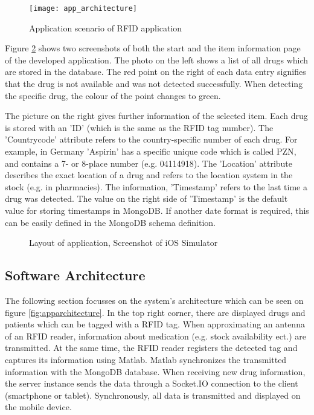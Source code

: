 \begin{figure}
\centering
\texttt{[image: app\_architecture]} 
\caption{\label{fig:appfunctionality}Application scenario of RFID application} 
\end{figure}

Figure \ref{fig:app_screenshot} shows two screenshots of both the start and the item information page of the developed application. The photo on the left shows a list of all drugs which are stored in the database. The red point on the right of each data entry signifies that the drug is not available and was not detected successfully. When detecting the specific drug, the colour of the point changes to green.

The picture on the right gives further information of the selected item. Each drug is stored with an 'ID' (which is the same as the RFID tag number). The 'Countrycode' attribute refers to the country-specific number of each drug. For example, in Germany 'Aspirin' has a specific unique code which is called \ac{PZN}, and contains a 7- or 8-place number (e.g. 04114918). The 'Location' attribute describes the exact location of a drug and refers to the location system in the stock (e.g. in pharmacies). The information, 'Timestamp' refers to the last time a drug was detected. The value on the right side of 'Timestamp' is the default value for storing timestamps in MongoDB. If another date format is required, this can be easily defined in the MongoDB schema definition.

\begin{figure}
\centering
{}
\caption{\label{fig:app_screenshot}Layout of application, Screenshot of iOS Simulator}
\end{figure}

\subsection{Software Architecture} \label{section_architecture}

The following section focusses on the system's architecture which can be seen on figure \ref{fig:apparchitecture}. In the top right corner, there are displayed drugs and patients which can be tagged with a RFID tag. When approximating an antenna of an RFID reader, information about medication (e.g. stock availability ect.) are transmitted. At the same time, the RFID reader registers the detected tag and captures its information using Matlab. Matlab synchronizes the transmitted information with the MongoDB database. When receiving new drug information, the server instance sends the data through a Socket.IO connection to the client (smartphone or tablet). Synchronously, all data is transmitted and displayed on the mobile device.

